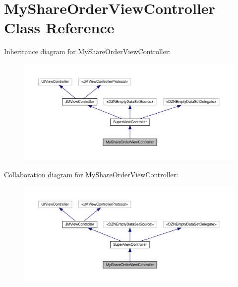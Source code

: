 \hypertarget{interface_my_share_order_view_controller}{}\section{My\+Share\+Order\+View\+Controller Class Reference}
\label{interface_my_share_order_view_controller}


Inheritance diagram for My\+Share\+Order\+View\+Controller\+:\nopagebreak
\begin{figure}[H]
\begin{center}
\leavevmode
\includegraphics[width=350pt]{interface_my_share_order_view_controller__inherit__graph}
\end{center}
\end{figure}


Collaboration diagram for My\+Share\+Order\+View\+Controller\+:\nopagebreak
\begin{figure}[H]
\begin{center}
\leavevmode
\includegraphics[width=350pt]{interface_my_share_order_view_controller__coll__graph}
\end{center}
\end{figure}
